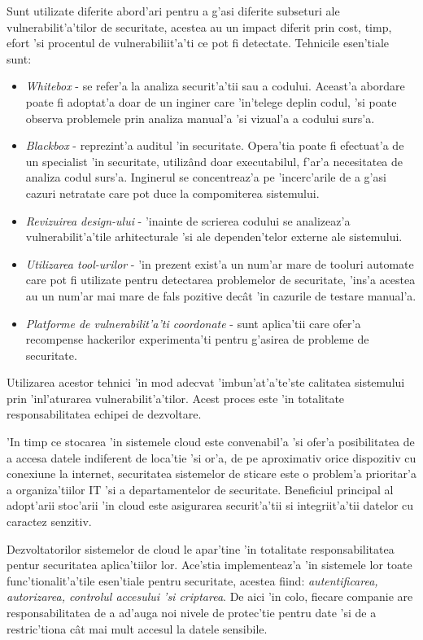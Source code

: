 \documentclass[12pt,a4paper,twoside]{report}
\begin{document}
Sunt utilizate diferite abord'ari pentru a g'asi diferite subseturi ale vulnerabilit'a'tilor de securitate, acestea au un impact diferit prin cost, timp, efort 'si procentul de vulnerabiliit'a'ti ce pot fi detectate. Tehnicile esen'tiale sunt:
\begin{itemize}
\item \textit{Whitebox} - se refer'a la analiza securit'a'tii sau a codului. Aceast'a abordare poate fi adoptat'a doar de un inginer care 'in'telege deplin codul, 'si poate observa problemele prin analiza manual'a 'si vizual'a a codului surs'a.
\item \textit{Blackbox} - reprezint'a auditul 'in securitate. Opera'tia poate fi efectuat'a de un specialist 'in securitate, utilizând doar executabilul, f'ar'a necesitatea de analiza codul surs'a. Inginerul se concentreaz'a pe 'incerc'arile de a g'asi cazuri netratate care pot duce la compomiterea sistemului.
\item \textit{Revizuirea design-ului} - 'inainte de scrierea codului se analizeaz'a vulnerabilit'a'tile arhitecturale 'si ale dependen'telor externe ale sistemului.
\item \textit{Utilizarea tool-urilor} - 'in prezent exist'a un num'ar mare de tooluri automate care pot fi utilizate pentru detectarea problemelor de securitate, 'ins'a acestea au un num'ar mai mare de fals pozitive decât 'in cazurile de testare manual'a.
\item \textit{Platforme de vulnerabilit'a'ti coordonate} - sunt aplica'tii care ofer'a recompense hackerilor experimenta'ti pentru g'asirea de probleme de securitate.
\end{itemize}

Utilizarea acestor tehnici 'in mod adecvat 'imbun'at'a'te'ste calitatea sistemului prin 'inl'aturarea vulnerabilit'a'tilor. Acest proces este 'in totalitate responsabilitatea echipei de dezvoltare.

'In timp ce stocarea 'in sistemele cloud este convenabil'a 'si ofer'a posibilitatea de a accesa datele indiferent de loca'tie 'si or'a, de pe aproximativ orice dispozitiv cu conexiune la internet, securitatea sistemelor de sticare este o problem'a prioritar'a a organiza'tiilor IT 'si a departamentelor de securitate. Beneficiul principal al adopt'arii stoc'arii 'in cloud este asigurarea securit'a'tii si integriit'a'tii datelor cu caractez senzitiv.

Dezvoltatorilor sistemelor de cloud le apar'tine 'in totalitate responsabilitatea pentur securitatea aplica'tiilor lor. Ace'stia implementeaz'a 'in sistemele lor toate func'tionalit'a'tile esen'tiale pentru securitate, acestea fiind: \textit{autentificarea, autorizarea, controlul accesului 'si criptarea}. De aici 'in colo, fiecare companie are responsabilitatea de a ad'auga noi nivele de protec'tie pentru date 'si de a restric'tiona cât mai mult accesul la datele sensibile.
\end{document}
